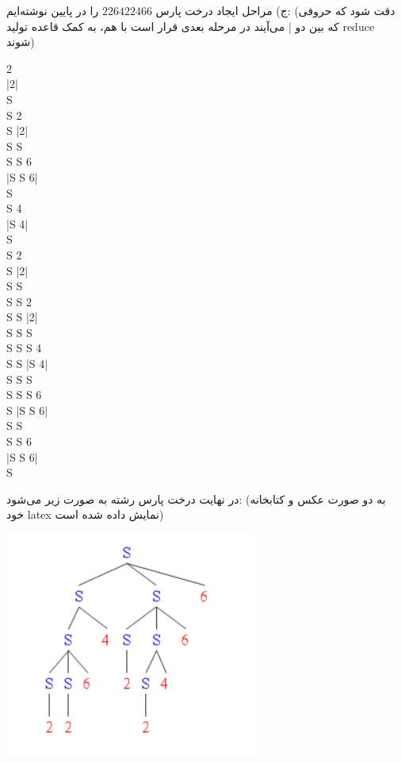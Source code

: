 ج) مراحل ایجاد درخت پارس $226422466$ را در پایین نوشته‌ایم: (دقت شود که حروفی که بین دو | می‌آیند در مرحله بعدی قرار است با هم، به کمک قاعده تولید reduce شوند)
\begin{latin}
	2
	\\
	|2|
	\\
	S
	\\
	S 2
	\\
	S |2|
	\\
	S S
	\\
	S S 6
	\\
	|S S 6|
	\\
	S
	\\
	S 4
	\\
	|S 4|
	\\
	S
	\\
	S 2
	\\
	S |2|
	\\
	S S
	\\
	S S 2
	\\
	S S |2|
	\\
	S S S
	\\
	S S S 4
	\\
	S S |S 4|
	\\
	S S S
	\\
	S S S 6
	\\
	S |S S 6|
	\\
	S S
	\\
	S S 6
	\\
	|S S 6|
	\\
	S
\end{latin}
در نهایت درخت پارس رشته به صورت زیر می‌شود: (به دو صورت عکس و کتابخانه خود latex نمایش داده شده است)
\begin{center}
	\includegraphics{226422466.png}
\end{center}

